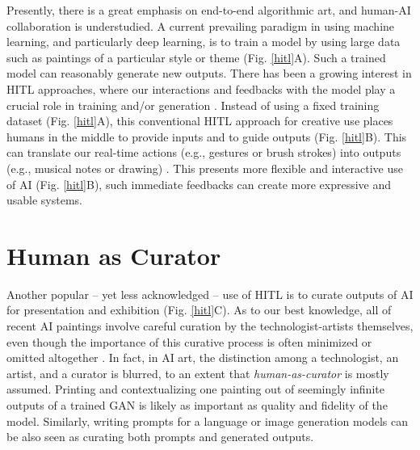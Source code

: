 \documentclass[letterpaper]{article} %
\begin{document}
Presently, there is a great emphasis on end-to-end algorithmic art, and human-AI collaboration is understudied. A current prevailing paradigm in using machine learning, and particularly deep learning, is to train a model by using large data such as paintings of a particular style or theme (Fig. \ref{hitl}A). Such a trained model can reasonably generate new outputs. There has been a growing interest in HITL approaches, where our interactions and feedbacks with the model play a crucial role in training and/or generation \cite{HITLML}. Instead of using a fixed training dataset (Fig. \ref{hitl}A), this conventional HITL approach for creative use places humans in the middle to provide inputs and to guide outputs (Fig. \ref{hitl}B). This can translate our real-time actions (e.g., gestures or brush strokes) into outputs (e.g., musical notes or drawing) \cite{Fiebrink2009}. This presents more flexible and interactive use of AI (Fig. \ref{hitl}B), such immediate feedbacks can create more expressive and usable systems.

\section{Human as Curator}

Another popular -- yet less acknowledged -- use of HITL is to curate outputs of AI for presentation and exhibition (Fig. \ref{hitl}C). As to our best knowledge, all of recent AI paintings involve careful curation by the technologist-artists themselves, even though the importance of this curative process is often minimized or omitted altogether \cite[e.g.][]{GANEdmondBelamy, Elgammal2017}. In fact, in AI art, the distinction among a technologist, an artist, and a curator is blurred, to an extent that \emph{human-as-curator} is mostly assumed. Printing and contextualizing one painting out of seemingly infinite outputs of a trained GAN is likely as important as quality and fidelity of the model. Similarly, writing prompts for a language or image generation models can be also seen as curating both prompts and generated outputs.
\end{document}

